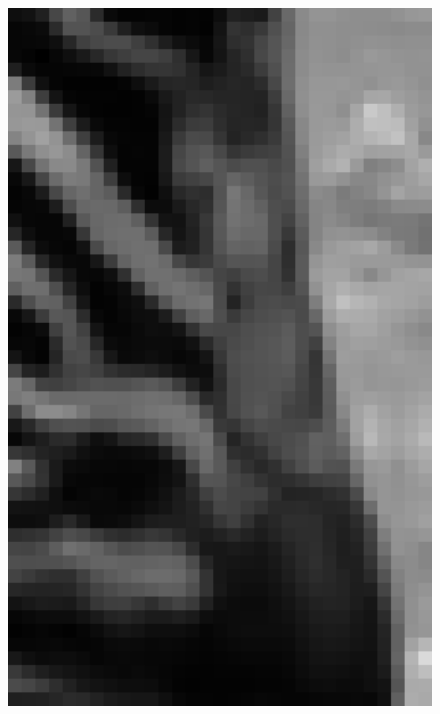 \documentclass[review,numbers,sort&compress]{elsarticle}  %
\begin{document}
\begin{figure}[t]
{\begin{minipage}[b]{0.15\textwidth}
                \includegraphics[width=1\textwidth]{compareImage/FIRF_zebra_mag_2.png}
            \end{minipage}
        }
\end{figure}
\end{document}
